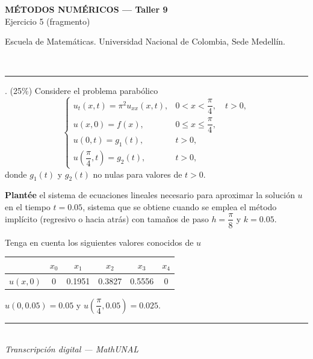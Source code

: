 \documentclass[11pt]{article}
\newcommand{\examheader}{%
  \noindent
  \begin{minipage}[t]{0.6\linewidth}
    {\small\bfseries MÉTODOS NUMÉRICOS --- Taller 9}\\
    {\small Ejercicio 5 (fragmento)}
  \end{minipage}%
  \hfill
  \begin{minipage}[t]{0.35\linewidth}
    \raggedleft\small Escuela de Matemáticas. Universidad Nacional de Colombia, Sede Medellín.
  \end{minipage}\\[2pt]
  \rule{\linewidth}{0.6pt}
}
\newcommand{\examfooter}{%
  \vfill
  \rule{\linewidth}{0.4pt}\\[1pt]
  {\scriptsize\textit{Transcripción digital --- MathUNAL}\hfill\textcolor{unalblue}{\textbf{\thepage}}}
}
\begin{document}
\examheader

\vspace{10pt}

. (25\%) Considere el problema parabólico
\[
\begin{cases}
u_t(x,t) = \pi^2 u_{xx}(x,t), & 0 < x < \dfrac{\pi}{4}, \quad t > 0, \\[4pt]
u(x,0) = f(x), & 0 \le x \le \dfrac{\pi}{4}, \\[4pt]
u(0,t) = g_1(t), & t > 0, \\[4pt]
u\!\left(\dfrac{\pi}{4},t\right) = g_2(t), & t > 0,
\end{cases}
\]
donde $g_1(t)$ y $g_2(t)$ no nulas para valores de $t > 0$.

\vspace{6pt}
\noindent\textbf{Plantée} el sistema de ecuaciones lineales necesario para aproximar la solución $u$ en el tiempo $t = 0.05$, sistema que se obtiene cuando se emplea el método implícito (regresivo o hacia atrás) con tamaños de paso $h = \dfrac{\pi}{8}$ y $k = 0.05$.

\vspace{6pt}
\noindent Tenga en cuenta los siguientes valores conocidos de $u$

\begin{center}
\begin{tabular}{c|ccccc}
 & $x_0$ & $x_1$ & $x_2$ & $x_3$ & $x_4$ \\
\hline
$u(x,0)$ & 0 & 0.1951 & 0.3827 & 0.5556 & 0
\end{tabular}
\end{center}

\vspace{6pt}
\noindent $u(0,0.05) = 0.05$ \quad y \quad $u\!\left(\dfrac{\pi}{4},0.05\right) = 0.025$.

\examfooter
\end{document}
